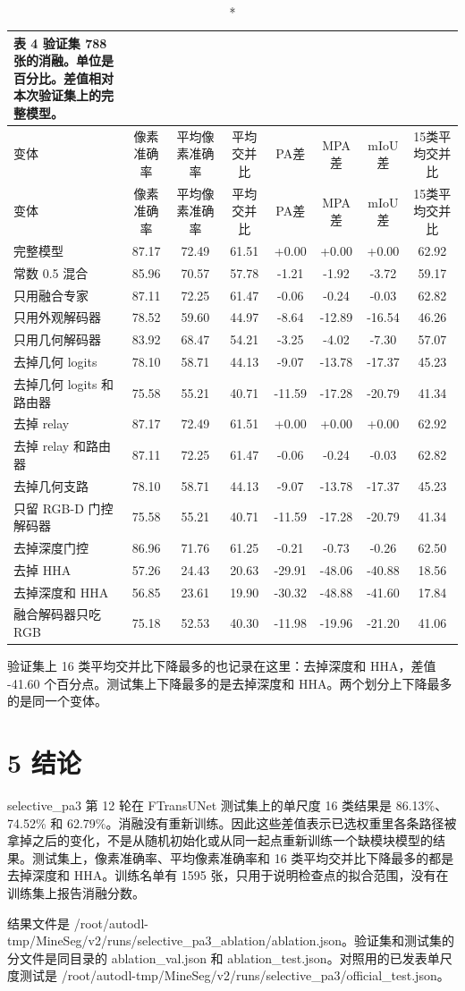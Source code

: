 \documentclass[11pt]{article}
\begin{document}
{\footnotesize\setlength{\tabcolsep}{3pt}
\begin{longtable}{lccccccc}
\caption*{表 4  验证集 788 张的消融。单位是百分比。差值相对本次验证集上的完整模型。}\\
\toprule
变体 & 像素准确率 & 平均像素准确率 & 平均交并比 & PA差 & MPA差 & mIoU差 & 15类平均交并比\\
\midrule
\endfirsthead
\toprule
变体 & 像素准确率 & 平均像素准确率 & 平均交并比 & PA差 & MPA差 & mIoU差 & 15类平均交并比\\
\midrule
\endhead
完整模型 & 87.17 & 72.49 & 61.51 & +0.00 & +0.00 & +0.00 & 62.92\\
常数 0.5 混合 & 85.96 & 70.57 & 57.78 & -1.21 & -1.92 & -3.72 & 59.17\\
只用融合专家 & 87.11 & 72.25 & 61.47 & -0.06 & -0.24 & -0.03 & 62.82\\
只用外观解码器 & 78.52 & 59.60 & 44.97 & -8.64 & -12.89 & -16.54 & 46.26\\
只用几何解码器 & 83.92 & 68.47 & 54.21 & -3.25 & -4.02 & -7.30 & 57.07\\
去掉几何 logits & 78.10 & 58.71 & 44.13 & -9.07 & -13.78 & -17.37 & 45.23\\
去掉几何 logits 和路由器 & 75.58 & 55.21 & 40.71 & -11.59 & -17.28 & -20.79 & 41.34\\
去掉 relay & 87.17 & 72.49 & 61.51 & +0.00 & +0.00 & +0.00 & 62.92\\
去掉 relay 和路由器 & 87.11 & 72.25 & 61.47 & -0.06 & -0.24 & -0.03 & 62.82\\
去掉几何支路 & 78.10 & 58.71 & 44.13 & -9.07 & -13.78 & -17.37 & 45.23\\
只留 RGB-D 门控解码器 & 75.58 & 55.21 & 40.71 & -11.59 & -17.28 & -20.79 & 41.34\\
去掉深度门控 & 86.96 & 71.76 & 61.25 & -0.21 & -0.73 & -0.26 & 62.50\\
去掉 HHA & 57.26 & 24.43 & 20.63 & -29.91 & -48.06 & -40.88 & 18.56\\
去掉深度和 HHA & 56.85 & 23.61 & 19.90 & -30.32 & -48.88 & -41.60 & 17.84\\
融合解码器只吃 RGB & 75.18 & 52.53 & 40.30 & -11.98 & -19.96 & -21.20 & 41.06\\
\bottomrule
\end{longtable}
}
验证集上 16 类平均交并比下降最多的也记录在这里：去掉深度和 HHA，差值 -41.60 个百分点。测试集上下降最多的是去掉深度和 HHA。两个划分上下降最多的是同一个变体。

\section*{5  结论}
selective\_pa3 第 12 轮在 FTransUNet 测试集上的单尺度 16 类结果是 86.13\%、74.52\% 和 62.79\%。消融没有重新训练。因此这些差值表示已选权重里各条路径被拿掉之后的变化，不是从随机初始化或从同一起点重新训练一个缺模块模型的结果。测试集上，像素准确率、平均像素准确率和 16 类平均交并比下降最多的都是去掉深度和 HHA。训练名单有 1595 张，只用于说明检查点的拟合范围，没有在训练集上报告消融分数。

结果文件是 /root/autodl-tmp/MineSeg/v2/runs/selective\_pa3\_ablation/ablation.json。验证集和测试集的分文件是同目录的 ablation\_val.json 和 ablation\_test.json。对照用的已发表单尺度测试是 /root/autodl-tmp/MineSeg/v2/runs/selective\_pa3/official\_test.json。
\end{document}
